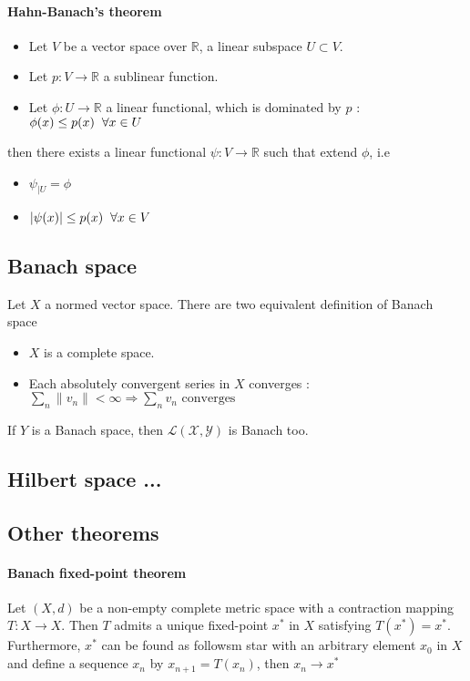 \documentclass[a4paper,10pt]{article}
\begin{document}
\paragraph{Hahn-Banach's theorem} 
\begin{itemize}
\renewcommand{\labelitemi}{$\vcenter{\hbox{\tiny$\bullet$}}$}
 \item Let $V$ be a vector space over $\mathbb{R}$, a linear subspace $U \subset V$.
 \item Let $p:V\longrightarrow \mathbb{R}$ a sublinear function.
 \item Let $\phi:U\longrightarrow \mathbb{R}$ a linear functional, which is dominated by $p$ : $\phi(x)\leq p(x) \hspace{2mm} \forall x \in U$
\end{itemize}
then there exists a linear functional $\psi:V\longrightarrow \mathbb{R}$ such that extend $\phi$, i.e
\begin{itemize}
\renewcommand{\labelitemi}{$\vcenter{\hbox{\tiny$\bullet$}}$}
 \item $\psi_{|U}=\phi$
 \item $|\psi(x)| \leq p(x) \hspace{2mm} \forall x \in V $
\end{itemize}

\subsection{Banach space}
Let $X$ a normed vector space. There are two equivalent definition of Banach space
\begin{itemize}
 \item $X$ is a complete space.
 \item Each absolutely convergent series in $X$ converges : $\sum_n \|v_n\| < \infty \Longrightarrow \sum_n v_n \text{ converges }  $ 
\end{itemize}
If $Y$ is a Banach space, then $\mathcal{L(X,Y)}$ is Banach too.


\subsection{Hilbert space ...}%


\subsection{Other theorems}

\paragraph{Banach fixed-point theorem}
Let $(X,d)$ be a non-empty complete metric space with a contraction mapping $T:X\longrightarrow X$. Then $T$ admits a unique fixed-point $x^{*}$ in $X$ satisfying $T(x^{*}) = x^{*}$. Furthermore, $x^{*}$ can be found as followsm star with an arbitrary element $x_0$ in $X$ and define a sequence ${x_n}$ by $x_{n+1}=T(x_n)$, then $x_n \longrightarrow x^*$
\end{document}
